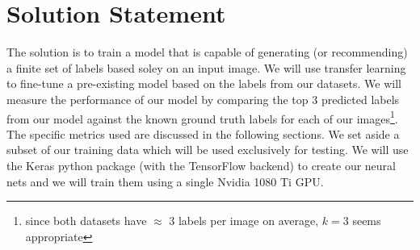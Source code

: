 \documentclass[10pt, a4paper, twocolumn]{article} %
\begin{document}

\section{Solution Statement}\label{sec:4} %



The solution is to train a model that is capable of generating (or recommending) a finite set of labels based soley on an input image.  We will use transfer learning to fine-tune a pre-existing model based on the labels from our datasets.  We will measure the performance of our model by comparing the top 3 predicted labels from our model against the known ground truth labels for each of our images\footnote{since both datasets have $\approx$ 3 labels per image on average, $k = 3$ seems appropriate}.  The specific metrics used are discussed in the following sections. We set aside a subset of our training data which will be used exclusively for testing. We will use the Keras python package (with the TensorFlow backend) to create our neural nets and we will train them using a single Nvidia 1080 Ti GPU.
\end{document}
